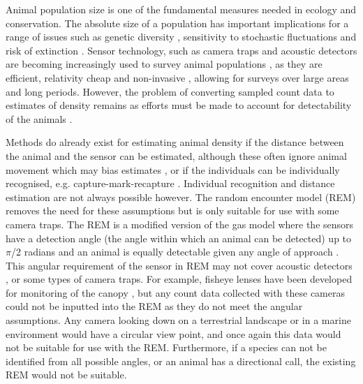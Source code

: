 Animal population size is one of the fundamental measures needed in ecology and conservation. The absolute size of a population has important implications for a range of issues such as genetic diversity \citep{o1985genetic, fischer2000genetic, willi2005threefold}, sensitivity to stochastic fluctuations \citep{richter1972extinction,wright1983stochastic} and risk of extinction \citep{purvis2000predicting}. Sensor technology, such as camera traps \citep{rowcliffe2008surveys,ahumada2011community} and acoustic detectors \citep{ofarrel1999comparison,mellinger2007fixed,walters2012continental} are becoming increasingly used to survey animal populations \citep{rowcliffe2008surveys, kessel2014review}, as they are efficient, relativity cheap and non-invasive \citep{gese2001monitoring, o2003crouching, silveira2003camera}, allowing for surveys over large areas and long periods. However, the problem of converting sampled count data to estimates of density remains as efforts must be made to account for detectability of the animals \citep{dail2011models, chandler2011inference, solymos2013calibrating}.


Methods do already exist for estimating animal density if the distance between the animal and the sensor can be estimated, although these often ignore animal movement which may bias estimates \citep{barlow2005estimates, marques2011estimating}, or if the individuals can be individually recognised, e.g. capture-mark-recapture \citep{karanth1995, trolle2003estimation, soisalo2006estimating, trolle2007camera}. Individual recognition and distance estimation are not always possible however. The random encounter model (REM) removes the need for these assumptions but is only suitable for use with some camera traps. The REM is a modified version of the gas model where the sensors have a detection angle (the angle within which an animal can be detected) up to $\pi$/2 radians and an animal is equally detectable given any angle of approach \citep{rowcliffe2008estimating}. This angular requirement of the sensor in REM may not cover acoustic detectors \citep{adams2012you}, or some types of camera traps. For example, fisheye lenses have been developed for monitoring of the canopy \citep{brusa2014increasing}, but any count data collected with these cameras could not be inputted into the REM as they do not meet the angular assumptions. Any camera looking down on a terrestrial landscape or in a marine environment would have a circular view point, and once again this data would not be suitable for use with the REM. Furthermore, if a species can not be identified from all possible angles, or an animal has a directional call, the existing REM would not be suitable.

